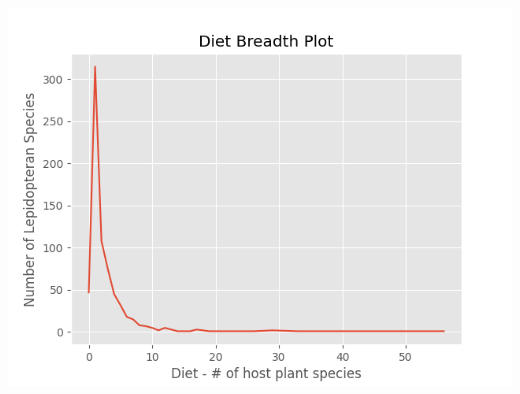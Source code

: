 \documentclass[
]{article}
\begin{document}
\begin{center}\includegraphics[width=800\linewidth,height=600\linewidth]{VPscripts/Diet Breadth Plot} \end{center}
\end{document}
